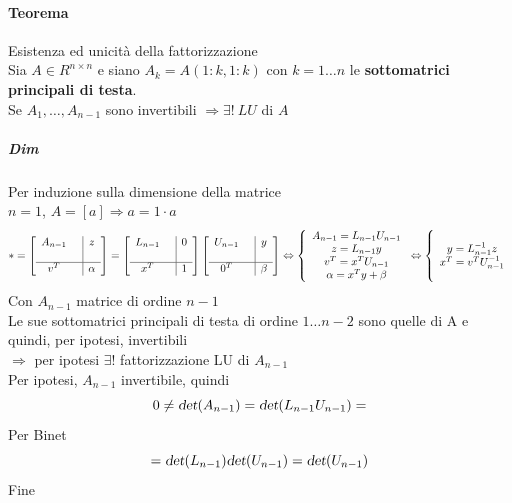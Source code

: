 \documentclass[10pt]{book}
\begin{document}
\paragraph{Teorema} Esistenza ed unicità della fattorizzazione\\
Sia $A \in R^{n \times n}$ e siano $A_k = A(1:k, 1:k)$ con $k = 1\ldots n$ le \textbf{sottomatrici principali di testa}.\\
Se $A_1, \ldots, A_{n-1}$ sono invertibili $\Rightarrow\exists !\: LU$ di $A$
\subparagraph{Dim} Per induzione sulla dimensione della matrice\\
$n = 1$, $A = [a] \Rightarrow a = 1\cdot a$
$$* = \left[ 
\begin{array}{c c | c}
	A_{n-1} & & z\\
	& &\\
	\hline
	v^T & & \alpha
\end{array}
\right]
= \left[ 
\begin{array}{c c | c}
	L_{n-1} & & 0\\
	& &\\
	\hline
	x^T & & 1
\end{array}
\right]
\left[ 
\begin{array}{c c | c}
	U_{n-1} & & y\\
	& &\\
	\hline
	0^T & & \beta
\end{array}
\right]
\Leftrightarrow
\left\{
\begin{array}{c}
A_{n-1} = L_{n-1}U_{n-1}\\
z = L_{n-1}y\\
v^T = x^T U_{n-1}\\
\alpha = x^T y + \beta
\end{array}
\right.
\Leftrightarrow
\left\{
\begin{array}{c}
\\
y = L_{n-1}^{-1}z\\
x^T = v^T U_{n-1}^{-1}\\
\\
\end{array}
\right.
$$
Con $A_{n-1}$ matrice di ordine $n - 1$\\
Le sue sottomatrici principali di testa di ordine $1\ldots n-2$ sono quelle di A e quindi, per ipotesi, invertibili\\
$\Rightarrow$ per ipotesi $\exists !$ fattorizzazione LU di $A_{n-1}$\\
Per ipotesi, $A_{n-1}$ invertibile, quindi
$$0 \neq \textsl{det}(A_{n-1}) = \textsl{det}(L_{n-1}U_{n-1}) =$$
Per Binet
$$ = \textsl{det}(L_{n-1})\textsl{det}(U_{n-1}) = \textsl{det}(U_{n-1})$$
Fine
\end{document}
